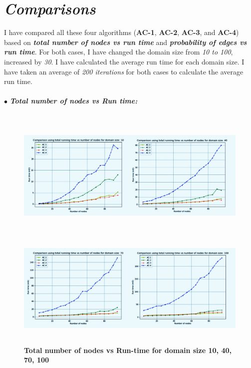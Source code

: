 \documentclass[12pt, english]{article}
\begin{document}
\section{\textit{Comparisons}}
\par
I have compared all these four algorithms (\textbf{AC-1}, \textbf{AC-2}, \textbf{AC-3}, and \textbf{AC-4}) based on \textit{\textbf{total number of nodes vs run time}} and \textit{\textbf{probability of edges vs run time}}. For both cases, I have changed the domain size from \textit{10 to 100}, increased by \textit{30}. I have calculated the average run time for each domain size. I have taken an average of \textit{200 iterations} for both cases to calculate the average run time.\\\\
\hspace*{0.5cm}$\bullet$ \textit{\textbf{Total number of nodes vs Run time:}}
\begin{figure}[ht]
		{\includegraphics[width=\textwidth,height=2.6in]{1.jpeg}}
		{\includegraphics[width=\textwidth,height=2in]{2.jpeg}}
		\caption{\textbf{Total number of nodes vs Run-time for domain size 10, 40, 70, 100}}
        \label{fig: 1}
\end{figure}
\end{document}
